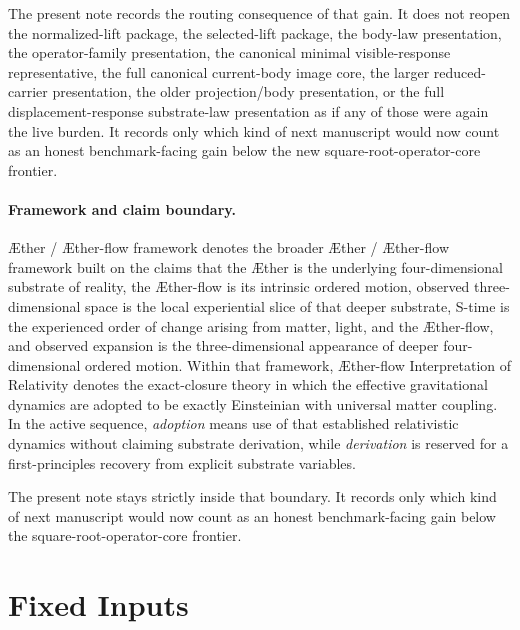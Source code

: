 \documentclass[11pt]{article}
\newcommand{\Aether}{\AE{}ther}
\newcommand{\Aflow}{\AE{}ther-flow}
\newcommand{\TheoryName}{\Aflow{} Interpretation of Relativity}
\newcommand{\TheoryProgram}{\Aether{} / \Aflow{} framework}
\begin{document}
The present note records the routing consequence of that gain. It does not reopen the normalized-lift package, the selected-lift package, the body-law presentation, the operator-family presentation, the canonical minimal visible-response representative, the full canonical current-body image core, the larger reduced-carrier presentation, the older projection/body presentation, or the full displacement-response substrate-law presentation as if any of those were again the live burden. It records only which kind of next manuscript would now count as an honest benchmark-facing gain below the new square-root-operator-core frontier.

\paragraph{Framework and claim boundary.}
\TheoryProgram{} denotes the broader \Aether{} / \Aflow{} framework built on the claims that the \Aether{} is the underlying four-dimensional substrate of reality, the \Aflow{} is its intrinsic ordered motion, observed three-dimensional space is the local experiential slice of that deeper substrate, S-time is the experienced order of change arising from matter, light, and the \Aflow{}, and observed expansion is the three-dimensional appearance of deeper four-dimensional ordered motion. Within that framework, \TheoryName{} denotes the exact-closure theory in which the effective gravitational dynamics are adopted to be exactly Einsteinian with universal matter coupling. In the active sequence, \emph{adoption} means use of that established relativistic dynamics without claiming substrate derivation, while \emph{derivation} is reserved for a first-principles recovery from explicit substrate variables.

The present note stays strictly inside that boundary. It records only which kind of next manuscript would now count as an honest benchmark-facing gain below the square-root-operator-core frontier.

\section{Fixed Inputs}
\end{document}
